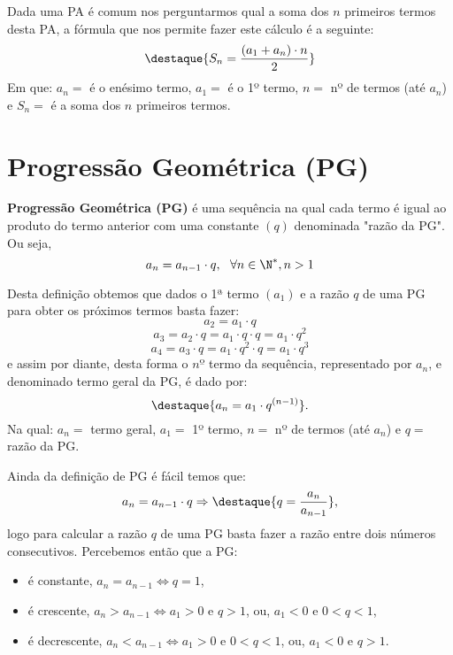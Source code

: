  Dada uma PA é comum nos perguntarmos qual a soma dos $n$ primeiros termos desta PA, a fórmula que nos permite fazer este cálculo é a seguinte:
 \[\destaque{S_n= \frac{(a_1 + a_n)\cdot n}{2}}\]
 Em que: $a_n=$ é o enésimo termo, $a_1=$ é o 1º termo, $n=$ nº de termos (até $a_n$) e $S_n=$ é a soma dos $n$ primeiros termos.



\section{Progressão Geométrica (PG)}

 \colorbox{azul}{
 \begin{minipage}{0.9\linewidth}
 \begin{center}
  \textbf{Progressão Geométrica (PG)} é uma sequência na qual cada termo é igual ao produto do termo anterior com uma constante $(q)$ denominada "razão da PG". Ou seja,
  \[a_{n}= a_{n-1} \cdot q, \ \ \forall n \in \N^{\ast}, n > 1\]
 \end{center}
 \end{minipage}}
 \vskip0.3cm

 Desta definição obtemos que dados o 1ª termo $(a_1)$ e a razão $q$ de uma PG para obter os próximos termos basta fazer:
 \[a_2= a_1 \cdot q\]
 \[a_3= a_2 \cdot q= a_1 \cdot q \cdot q= a_1 \cdot q^2\]
 \[a_4= a_3 \cdot q= a_1 \cdot q^2 \cdot q= a_1 \cdot q^3 \]
 e assim por diante, desta forma o $nº$ termo da sequência, representado por $a_n$, e denominado termo geral da PG, é dado por:
 \[\destaque{a_n= a_1 \cdot q^{(n-1)}} .\]
 Na qual: $a_n=$ termo geral, $a_1=$ 1º termo, $n=$ nº de termos (até $a_n$) e $q=$ razão da PG.

 Ainda da definição de PG é fácil temos que:
 \[a_{n}= a_{n-1} \cdot q \Rightarrow
 \destaque{q= \frac{a_{n}}{ a_{n-1}}} ,\]
 logo para calcular a razão $q$ de uma PG basta fazer a razão entre dois números consecutivos. Percebemos então que a PG:
 \begin{itemize}
  \item é constante, $a_n= a_{n-1} \Leftrightarrow q= 1$,
  \item é crescente, $a_n > a_{n-1} \Leftrightarrow a_1 > 0$ e $q > 1$, ou, $a_1 < 0$ e $0 < q < 1$,
  \item é decrescente, $a_n < a_{n-1} \Leftrightarrow a_1 > 0$ e $0 < q < 1$, ou, $a_1 < 0$ e $q > 1$.
 \end{itemize}

